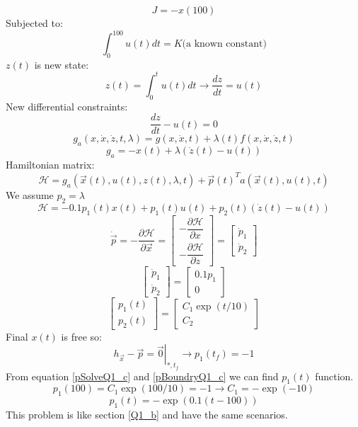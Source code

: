 $$J = -x(100)$$
Subjected to:
$$\int_0^{100}u(t)dt = K\text{(a known constant)}$$
$z(t)$ is new state:
$$z(t) = \int_0^{t}u(t)dt \to \dfrac{dz}{dt} =u(t) $$
New differential constraints:
$$\dfrac{dz}{dt} - u(t) = 0$$
$$g_a(x, \dot x, \dot z, t, \lambda) = g(x, \dot x, t) + \lambda(t)f(x, \dot x, \dot z, t) $$
$$g_a = -x(t) + \lambda (\dot z (t)- u(t))$$
Hamiltonian matrix:
$$\mathcal{H} =  g_a(\vec x(t), u(t), z(t), \lambda,  t) + {\vec{p}(t)}^Ta(\vec x(t), u(t), t)$$
We assume $p_2 = \lambda$
\begin{equation}\label{HamiltonianQ1_c}
	\mathcal{H} = -0.1p_1(t)x(t)+p_1(t)u(t) + p_2(t)(\dot z(t)- u(t))
\end{equation}
$$\dot{\vec{p}} = -\dfrac{\partial \mathcal{H} }{\partial \vec x} =  \begin{bmatrix}
	-\dfrac{\partial \mathcal{H} }{\partial x} \\[10pt]
	-\dfrac{\partial \mathcal{H} }{\partial z} 
\end{bmatrix} = 
\begin{bmatrix}
	\dot p_1 \\
	\dot p_2
\end{bmatrix}
$$
$$
\begin{bmatrix}
	\dot p_1 \\
	\dot p_2
\end{bmatrix} = \begin{bmatrix}
	0.1p_1\\
	0
\end{bmatrix}
$$
\begin{equation}\label{pSolveQ1_c}
	\begin{bmatrix}
		p_1(t)\\
		p_2(t)
	\end{bmatrix} = 
	\begin{bmatrix}
		C_1\exp(t/10)\\
		C_2
	\end{bmatrix}
\end{equation}
Final $x(t)$ is free so:
\begin{equation}\label{pBoundryQ1_c}
 \left .h_{\vec x} - \vec{p} = \vec{0} \right \vert_{*, t_f} \to p_1(t_f) = -1
\end{equation}
From equation \ref{pSolveQ1_c} and \ref{pBoundryQ1_c} we can find $p_1(t)$ function.
$$
p_1(100) = C_1\exp(100/10) = -1 \to C_1 = -\exp(-10)
$$
$$
p_1(t) = -\exp(0.1(t-100))$$
This problem is like section \ref{Q1_b} and have the same scenarios.